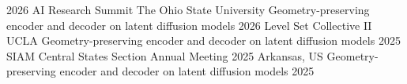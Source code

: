 

\begin{cvtalks}
\cvtalk
    {2026 AI Research Summit} %
    {The Ohio State University}
    {Geometry-preserving encoder and decoder on latent diffusion models} %
    {2026} %
\cvtalk
    {Level Set Collective II} %
    {UCLA}
    {Geometry-preserving encoder and decoder on latent diffusion models} %
    {2025} %
\cvtalk
    {SIAM Central States Section Annual Meeting 2025} %
    {Arkansas, US}
    {Geometry-preserving encoder and decoder on latent diffusion models} %
    {2025} %


\end{cvtalks}
